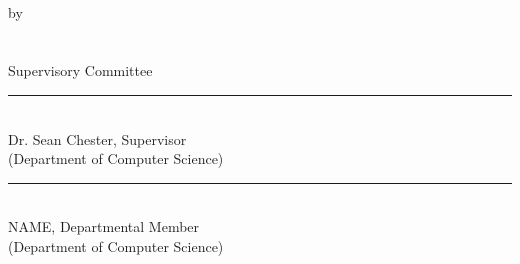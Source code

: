 
\pagestyle{plain} 
{}
{\sf
  {\centering
	\TITLE\\[4ex]
	by \\[2ex]
        {\AUTHOR}\\
	\CREDENTIALS \\ [20ex]
  }
   Supervisory Committee\\[4ex]

   \noindent\rule{\linewidth}{1mm}\\[1ex]
   Dr. Sean Chester, Supervisor\\
   (Department of Computer Science)\\[6ex]
\noindent\rule{\linewidth}{1mm}\\[1ex]
    NAME, Departmental Member\\
   (Department of Computer Science)\\[3ex]
}
\clearpage

